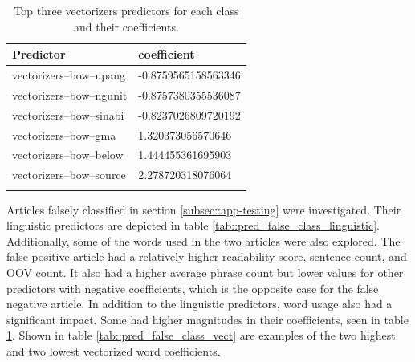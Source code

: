 \begin{table}
    \begin{tabularx}{\textwidth}{|l|l|}
        \hline
        Predictor & coefficient \\ 
        \hline
        \rowcolor{LightRed}
        vectorizers--bow--upang & -0.8759565158563346\\
        \hline
        \rowcolor{LightRed}
        vectorizers--bow--ngunit & -0.8757380355536087\\
        \hline
        \rowcolor{LightRed}
        vectorizers--bow--sinabi & -0.8237026809720192\\
        \hline
        \rowcolor{LightGreen}
        vectorizers--bow--gma & 1.320373056570646\\
        \hline
        \rowcolor{LightGreen}
        vectorizers--bow--below & 1.444455361695903\\
        \hline
        \rowcolor{LightGreen}
        vectorizers--bow--source & 2.278720318076064\\
        \hline
    \caption{Top three vectorizers predictors for each class and their coefficients.}
    \label{tab::vec_coef}
    \end{tabularx}
\end{table}

Articles falsely classified in section \ref{subsec::app-testing} were investigated. Their linguistic predictors are depicted in table \ref{tab::pred_false_class_linguistic}. Additionally, some of the words used in the two articles were also explored. The false positive article had a relatively higher readability score, sentence count, and OOV count. It also had a higher average phrase count but lower values for other predictors with negative coefficients, which is the opposite case for the false negative article. In addition to the linguistic predictors, word usage also had a significant impact. Some had higher magnitudes in their coefficients, seen in table \ref{tab::vec_coef}. Shown in table \ref{tab::pred_false_class_vect} are examples of the two highest and two lowest vectorized word coefficients.

